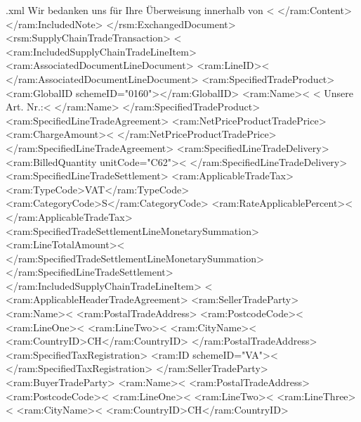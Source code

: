 \begin{filecontents*}{\jobname.xml}
Wir bedanken uns für Ihre Überweisung innerhalb von <%
      </ram:Content>
    </ram:IncludedNote>
  </rsm:ExchangedDocument>
  <rsm:SupplyChainTradeTransaction>
    <%
    <ram:IncludedSupplyChainTradeLineItem>
      <ram:AssociatedDocumentLineDocument>
        <ram:LineID><%
      </ram:AssociatedDocumentLineDocument>
      <ram:SpecifiedTradeProduct>
        <ram:GlobalID schemeID="0160"></ram:GlobalID>
        <ram:Name><%
<%
Unsere Art. Nr.:<%
        </ram:Name>
      </ram:SpecifiedTradeProduct>
	        <ram:SpecifiedLineTradeAgreement>
        <ram:NetPriceProductTradePrice>
          <ram:ChargeAmount><%
        </ram:NetPriceProductTradePrice>
      </ram:SpecifiedLineTradeAgreement>
      <ram:SpecifiedLineTradeDelivery>
        <ram:BilledQuantity unitCode="C62"><%
      </ram:SpecifiedLineTradeDelivery>
      <ram:SpecifiedLineTradeSettlement>
	   <ram:ApplicableTradeTax>
       <ram:TypeCode>VAT</ram:TypeCode>
       <ram:CategoryCode>S</ram:CategoryCode>
          <ram:RateApplicablePercent><%
        </ram:ApplicableTradeTax>
        <ram:SpecifiedTradeSettlementLineMonetarySummation>
          <ram:LineTotalAmount><%
        </ram:SpecifiedTradeSettlementLineMonetarySummation>
      </ram:SpecifiedLineTradeSettlement>
    </ram:IncludedSupplyChainTradeLineItem>
    <%
    <ram:ApplicableHeaderTradeAgreement>
      <ram:SellerTradeParty>
        <ram:Name><%
        <ram:PostalTradeAddress>
          <ram:PostcodeCode><%
          <ram:LineOne><%
					<ram:LineTwo><%
          <ram:CityName><%
          <ram:CountryID>CH</ram:CountryID>
        </ram:PostalTradeAddress>
        <ram:SpecifiedTaxRegistration>
          <ram:ID schemeID="VA"><%
        </ram:SpecifiedTaxRegistration>
      </ram:SellerTradeParty>
      <ram:BuyerTradeParty>
        <ram:Name><%
        <ram:PostalTradeAddress>
          <ram:PostcodeCode><%
          <ram:LineOne><%
          <ram:LineTwo><%
          <ram:LineThree><%
          <ram:CityName><%
          <ram:CountryID>CH</ram:CountryID>

\end{filecontents*}
